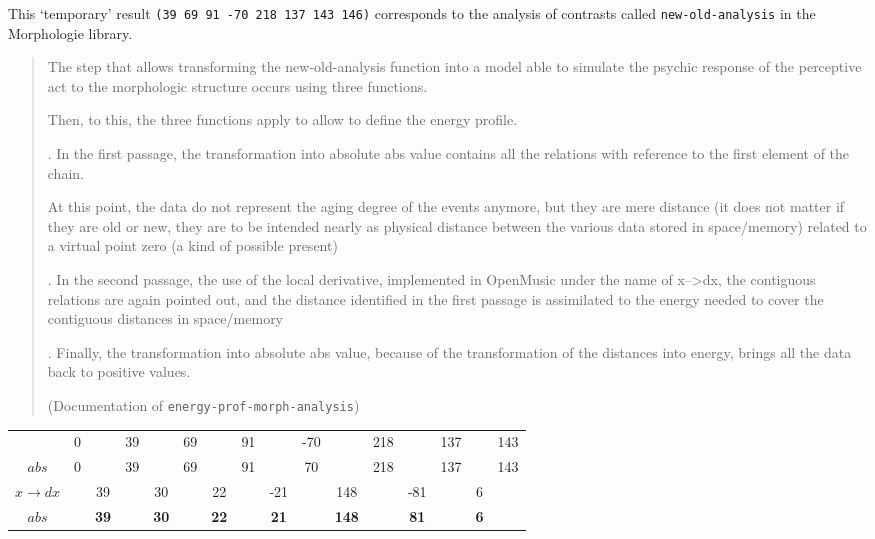 \bigskip 

This `temporary' result \texttt{(39 69 91 -70 218 137 143 146)} corresponds to the analysis of contrasts called \texttt{new-old-analysis} in the Morphologie library.

\begin{quotation} 
\begin{slshape} 
\noindent The step that allows transforming the new-old-analysis function into a model able to simulate the psychic response of the perceptive act to the morphologic structure occurs using three functions.

\noindent Then, to this, the three functions apply to allow to define the energy profile.

. In the first passage, the transformation into absolute abs value contains all the relations with reference to the first element of the chain.

\noindent At this point, the data do not represent the aging degree of the events anymore, but they are mere distance (it does not matter if they are old or new, they are to be intended nearly as physical distance between the various data stored in space/memory) related to a virtual point zero (a kind of possible present)

. In the second passage, the use of the local derivative, implemented in OpenMusic under the name of x–>dx, the contiguous relations are again pointed out, and the distance identified in the first passage is assimilated to the energy needed to cover the contiguous distances in space/memory

. Finally, the transformation into absolute abs value, because of the transformation of the distances into energy, brings all the data back to positive values.
\end{slshape} 

\noindent (Documentation of \texttt{energy-prof-morph-analysis})
\end{quotation} 

\bigskip

\noindent
\begin{adjustbox}{center}
\begin{tabular}{cccccccccccccccc}
 &	0 &	 &	39 & &	69 & &	91 & &	-70 & &	218 & &	137 & &	143 \\
\cellcolor {gray!20} $abs$ & 0 & &	39 & & 69 & & 91 & & 70 & &	218 & &	137 & &	143 \\
\cellcolor {gray!20} $x \rightarrow dx$ & & 39 & &	30 & & 22 & & -21 & & 148 & & -81 & & 6 & \\
\cellcolor {gray!20} $abs$ &\cellcolor {gray!20} &\cellcolor {gray!20} \bf 39 &\cellcolor {gray!20} &\cellcolor {gray!20} \bf 30 &\cellcolor {gray!20} &\cellcolor {gray!20} \bf 22 &\cellcolor {gray!20} &\cellcolor {gray!20} \bf 21 &\cellcolor {gray!20} &\cellcolor {gray!20} \bf 148 &\cellcolor {gray!20} &\cellcolor {gray!20} \bf 81 &\cellcolor {gray!20} &\cellcolor {gray!20} \bf 6 &\cellcolor {gray!20} \\
\end{tabular}
\end{adjustbox}

